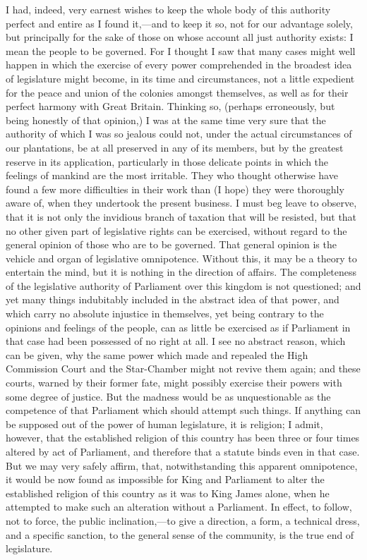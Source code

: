 I had, indeed, very earnest wishes to keep the whole body of this authority perfect and entire as I found it,—and to keep it so, not for our advantage solely, but principally for the sake of those on whose account all just authority exists: I mean the people to be governed. For I thought I saw that many cases might well happen in which the exercise of every power comprehended in the broadest idea of legislature might become, in its time and circumstances, not a little expedient for the peace and union of the colonies amongst themselves, as well as for their perfect harmony with Great Britain. Thinking so, (perhaps erroneously, but being honestly of that opinion,) I was at the same time very sure that the authority of which I was so jealous could not, under the actual circumstances of our plantations, be at all preserved in any of its members, but by the greatest reserve in its application, particularly in those delicate points in which the feelings of mankind are the most irritable. They who thought otherwise have found a few more difficulties in their work than (I hope) they were thoroughly aware of, when they undertook the present business. I must beg leave to observe, that it is not only the invidious branch of taxation that will be resisted, but that no other given part of legislative rights can be exercised, without regard to the general opinion of those who are to be governed. That general opinion is the vehicle and organ of legislative omnipotence. Without this, it may be a theory to entertain the mind, but it is nothing in the direction of affairs. The completeness of the legislative authority of Parliament over this kingdom is not questioned; and yet many things indubitably included in the abstract idea of that power, and which carry no absolute injustice in themselves, yet being contrary to the opinions and feelings of the people, can as little be exercised as if Parliament in that case had been possessed of no right at all. I see no abstract reason, which can be given, why the same power which made and repealed the High Commission Court and the Star-Chamber might not revive them again; and these courts, warned by their former fate, might possibly exercise their powers with some degree of justice. But the madness would be as unquestionable as the competence of that Parliament which should attempt such things. If anything can be supposed out of the power of human legislature, it is religion; I admit, however, that the established religion of this country has been three or four times altered by act of Parliament, and therefore that a statute binds even in that case. But we may very safely affirm, that, notwithstanding this apparent omnipotence, it would be now found as impossible for King and Parliament to alter the established religion of this country as it was to King James alone, when he attempted to make such an alteration without a Parliament. In effect, to follow, not to force, the public inclination,—to give a direction, a form, a technical dress, and a specific sanction, to the general sense of the community, is the true end of legislature.

